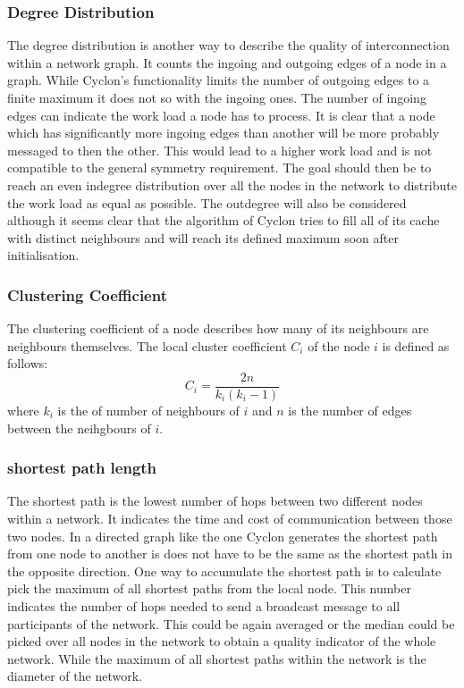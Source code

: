 \subsubsection{Degree Distribution}
The degree distribution is another way to describe the quality of
interconnection within a network graph. It counts the ingoing and outgoing edges
of a node in a graph. While Cyclon's functionality limits the number of outgoing
edges to a finite maximum it does not so with the ingoing ones. The number of
ingoing edges can indicate the work load a node has to process. It is clear that
a node which has significantly more ingoing edges than another will be more
probably messaged to then the other. This would lead to a higher work load and
is not compatible to the general symmetry requirement. The goal should then be
to reach an even indegree distribution over all the nodes in the network to
distribute the work load as equal as possible. The outdegree will also be
considered although it seems clear that the algorithm of Cyclon tries to fill
all of its cache with distinct neighbours and will reach its defined maximum
soon after initialisation.
\subsubsection{Clustering Coefficient}
The clustering coefficient of a node describes how many of its neighbours are
neighbours themselves. The local cluster coefficient $C_i$ of the node $i$ is
defined as follows:
\[C_i = \frac{2n}{k_i(k_i-1)}\]
where $k_i$ is the of number of neighbours of $i$ and $n$ is the number of edges
between the neihgbours of $i$.

\subsubsection{shortest path length}
The shortest path is the lowest number of hops between two different nodes
within a network. It indicates the time and cost of communication between those
two nodes. In a directed graph like the one Cyclon generates the shortest path
from one node to another is does not have to be the same as the shortest path in
the opposite direction. One way to accumulate the shortest path is to calculate
pick the maximum of all shortest paths from the local node. This number
indicates the number of hops needed to send a broadcast message to all
participants of the network. This could be again averaged or the median could be
picked over all nodes in the network to obtain a quality indicator of the whole
network. While the maximum of all shortest paths within the network is the
diameter of the network.
